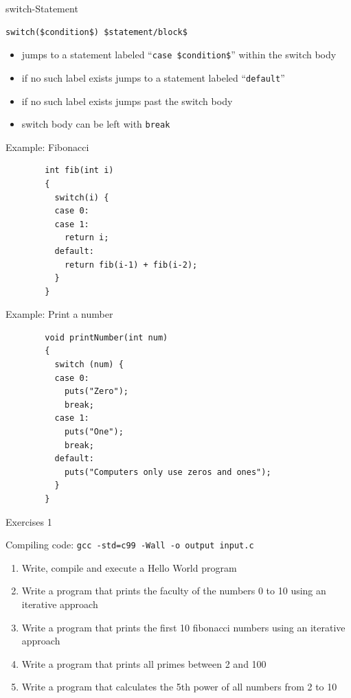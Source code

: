 \documentclass[english,compress]{beamer}
\begin{document}
\begin{frame}[fragile]
	\begin{block}{switch-Statement}
		\begin{lstlisting}[numbers=none]
			switch($condition$) $statement/block$ 
		\end{lstlisting}
		\begin{itemize}
			\item jumps to a statement labeled ``\lstinline|case $condition$|'' within the switch body
			\item if no such label exists jumps to a statement labeled ``\lstinline|default|''
			\item if no such label exists jumps past the switch body
			\item switch body can be left with \lstinline|break|
		\end{itemize}
	\end{block}
\end{frame}

\begin{frame}[fragile]{Example: Fibonacci}
	\begin{lstlisting}
		int fib(int i)
		{
		  switch(i) {
		  case 0:
		  case 1:
		    return i;
		  default:
		    return fib(i-1) + fib(i-2);
		  }
		}
	\end{lstlisting}
\end{frame}

\begin{frame}[fragile]{Example: Print a number}
	\begin{lstlisting}
		void printNumber(int num)
		{
		  switch (num) {
		  case 0:
		    puts("Zero");
		    break;
		  case 1:
		    puts("One");
		    break;
		  default:
		    puts("Computers only use zeros and ones");
		  }
		}
	\end{lstlisting}
\end{frame}

\begin{frame}[fragile]{Exercises 1}
	\begin{center}
		Compiling code: \verb|gcc -std=c99 -Wall -o output input.c|
	\end{center}
	\begin{enumerate}
		\item Write, compile and execute a Hello World program
		\item Write a program that prints the faculty of the numbers 0 to 10 using an iterative approach
		\item Write a program that prints the first 10 fibonacci numbers using an iterative approach
		\item Write a program that prints all primes between 2 and 100
		\item Write a program that calculates the 5th power of all numbers from 2 to 10
	\end{enumerate}
\end{frame}
\end{document}

